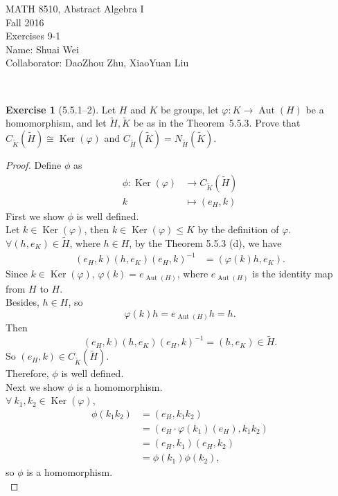 \documentclass{amsart}
\renewcommand{\ker}{\operatorname{Ker}}
\newcommand{\wti}{\widetilde}
\theoremstyle{plain}
\theoremstyle{definition}
\newtheorem{exer}[lem]{Exercise}
\begin{document}
\noindent MATH 8510, Abstract Algebra I \\
Fall 2016\\
Exercises 9-1\\
Name: Shuai Wei\\
Collaborator: DaoZhou Zhu, XiaoYuan Liu

\

%
%

\begin{exer}[5.5.1--2]
Let $H$ and $K$ be groups, let $\varphi\colon K\to \operatorname{Aut}(H)$ be a homomorphism, and let $\wti H,\wti K$ be as in the Theorem~5.5.3.
Prove that $C_{\wti K}(\wti H)\cong\ker(\varphi)$
and $C_{\wti H}(\wti K)=N_{\wti H}(\wti K)$.

\begin{proof}
	Define $\phi$ as
	\begin{align*}
	  \phi: \ker(\varphi) & \to C_{\wti K}(\wti H)\\
	  	k &\mapsto (e_H,k)
	\end{align*}
	First we show $\phi$ is well defined.\\
	Let $k \in \ker(\varphi)$, then $k \in \ker(\varphi) \leq K$ by the definition of $\varphi$.\\ 
	$\forall (h,e_K) \in \wti H$, where $h \in H$, by the Theorem 5.5.3 (d), we have 
	\begin{align*}
	  (e_H,k)(h,e_K)(e_H,k)^{-1} &= (\varphi(k)h, e_K).
	\end{align*}
	Since $k \in \ker(\varphi)$, $\varphi(k) = e_{\operatorname{Aut}(H)} $, where $e_{\operatorname{Aut}(H)}$ is the identity map from $H$ to $H$.\\
	  Besides, $h \in H$, so 
	  \[\varphi(k)h  = e_{\operatorname{Aut}(H)}h =h.\]
	  Then 
	  \[(e_H,k)(h,e_K)(e_H,k)^{-1} =(h, e_K) \in \wti H.\]
	  So $(e_H,k) \in C_{\wti K}(\wti H)$.\\
	  Therefore, $\phi$ is well defined. \\
	  Next we show $\phi$ is a homomorphism.\\
	 $\forall\ k_1,k_2 \in \ker(\varphi)$, 
	 \begin{align*}
	   \phi(k_1k_2) &=(e_H,k_1k_2) \\
	   			    &=\left(e_H\cdot\varphi(k_1)(e_H),k_1k_2\right)\\
	   				&=(e_H,k_1)(e_H,k_2)\\
	   				&=\phi(k_1)\phi(k_2),
	 \end{align*}
	 so $\phi$ is a homomorphism.\\

\end{proof}
\end{exer}
\end{document}
